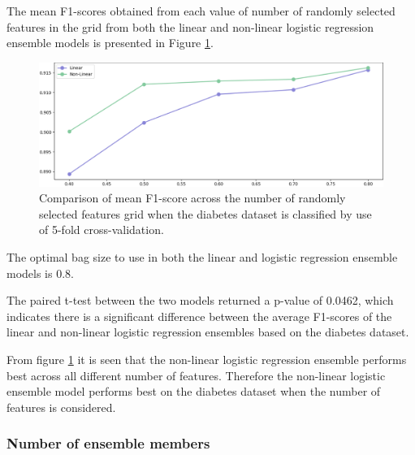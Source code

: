 \documentclass[10pt, conference]{IEEEtran}
\begin{document}
The mean F1-scores obtained from each value of number of randomly selected features in the grid from both the linear and non-linear
logistic regression ensemble models is presented in Figure \ref{fig:D_features_comparison}.
\begin{figure}[H]
    \centerline{\includegraphics[scale=0.26]{../Images/D_features.PNG}}
    \caption{Comparison of mean F1-score across the number of randomly selected features grid when the diabetes dataset is classified by use of 5-fold cross-validation.}
    \label{fig:D_features_comparison}
\end{figure}
The optimal bag size to use in both the linear and logistic regression ensemble models is 0.8.

The paired t-test between the two models returned a p-value of 0.0462, which indicates there is a significant difference
between the average F1-scores of the linear and non-linear logistic regression ensembles based on the diabetes dataset.

From figure \ref{fig:D_features_comparison} it is seen that the non-linear logistic regression ensemble performs best across
all different number of features. Therefore the non-linear logistic ensemble model performs best on the diabetes dataset when the
number of features is considered.

\subsubsection{Number of ensemble members}
\end{document}
